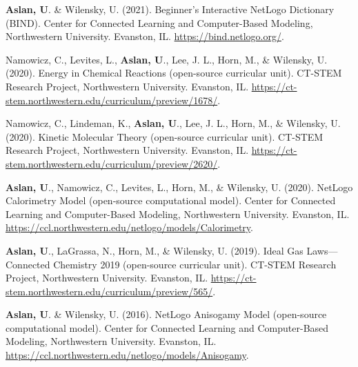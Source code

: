 \documentclass[11pt,letterpaper]{report} %
\begin{document}
    \begin{tablist}

        \item[2021] \tab{}\textbf{Aslan, U}. \& Wilensky, U. (2021). Beginner’s Interactive NetLogo Dictionary (BIND). Center for Connected Learning and Computer-Based Modeling, Northwestern University. Evanston, IL. \href{https://bind.netlogo.org/}{https://bind.netlogo.org/}.

        \item[2020]     \tab{}Namowicz, C., Levites, L., \textbf{Aslan, U}., Lee, J. L., Horn, M., \& Wilensky, U. (2020). Energy in Chemical Reactions (open-source curricular unit). CT-STEM Research Project, Northwestern University. Evanston, IL. \href{https://ct-stem.northwestern.edu/curriculum/preview/1678/}{https://ct-stem.northwestern.edu/curriculum/preview/1678/}.

        \item[]     \tab{}Namowicz, C., Lindeman, K., \textbf{Aslan, U}., Lee, J. L., Horn, M., \& Wilensky, U. (2020). Kinetic Molecular Theory (open-source curricular unit). CT-STEM Research Project, Northwestern University. Evanston, IL. \href{https://ct-stem.northwestern.edu/curriculum/preview/2620/}{https://ct-stem.northwestern.edu/curriculum/preview/2620/}.

        \item[]     \tab{}\textbf{Aslan, U}., Namowicz, C., Levites, L., Horn, M., \& Wilensky, U. (2020). NetLogo Calorimetry Model (open-source computational model). Center for Connected Learning and Computer-Based Modeling, Northwestern University. Evanston, IL. \href{https://ccl.northwestern.edu/netlogo/models/Calorimetry}{https://ccl.northwestern.edu/netlogo/models/Calorimetry}.

        \item[2019] \tab{}\textbf{Aslan, U}., LaGrassa, N., Horn, M., \& Wilensky, U. (2019). Ideal Gas Laws---Connected Chemistry 2019 (open-source curricular unit). CT-STEM Research Project, Northwestern University. Evanston, IL. \href{https://ct-stem.northwestern.edu/curriculum/preview/565/}{https://ct-stem.northwestern.edu/curriculum/preview/565/}.

         \item[2016]     \tab{}\textbf{Aslan, U}. \& Wilensky, U. (2016). NetLogo Anisogamy Model (open-source computational model). Center for Connected Learning and Computer-Based Modeling, Northwestern University. Evanston, IL. \href{https://ccl.northwestern.edu/netlogo/models/Anisogamy}{https://ccl.northwestern.edu/netlogo/models/Anisogamy}.

    \end{tablist}
\end{document}
